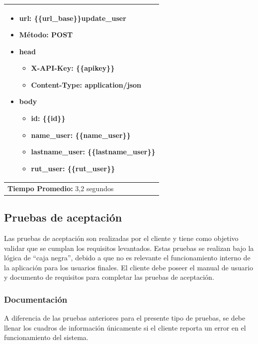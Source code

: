 \begin{table}[H]
\begin{tabular}{|p{}|}
\begin{itemize}
			\begin{itemize}
				\item url: \{\{url\_base\}\}update\_user
				\item Método: POST
				\item head
				\begin{itemize}
					\item X-API-Key: \{\{apikey\}\}
					\item Content-Type: application/json
				\end{itemize}
				\item body
				\begin{itemize}
					\item id: \{\{id\}\}
					\item name\_user: \{\{name\_user\}\}
					\item lastname\_user: \{\{lastname\_user\}\}
					\item rut\_user: \{\{rut\_user\}\}
				\end{itemize}
			\end{itemize}
		\end{itemize}\\ \hline

		\textbf{Tiempo Promedio:} 3,2 segundos\\ \hline
    \end{tabular}
\end{table}

\subsection{Pruebas de aceptación}

Las pruebas de aceptación son realizadas por el cliente y tiene como objetivo validar que se cumplan los requisitos levantados. Estas pruebas se realizan bajo la lógica de “caja negra”, debido a que no es relevante el funcionamiento interno de la aplicación para los usuarios finales. 
El cliente debe poseer el manual de usuario y documento de requisitos para completar las pruebas de aceptación. 



\subsubsection{Documentación}

A diferencia de las pruebas anteriores para el presente tipo de pruebas, se debe llenar los cuadros de información únicamente si el cliente reporta un error en el funcionamiento del sistema.

